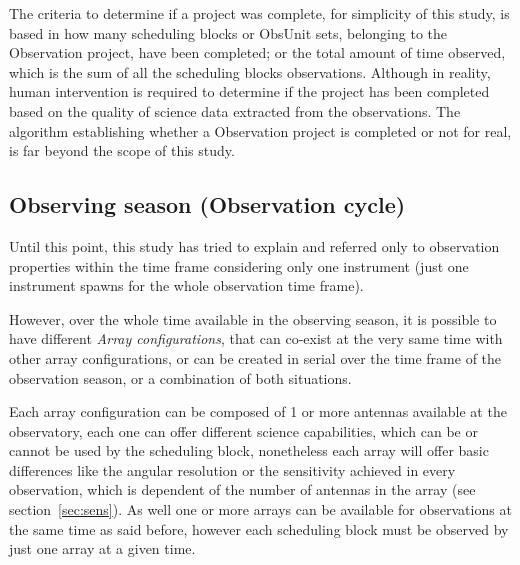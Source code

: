 The criteria to determine if a project was complete, for simplicity of this study, is based in how many scheduling blocks or ObsUnit sets, belonging to the Observation project, have been completed; or the total amount of time observed, which is the sum of all the scheduling blocks observations. Although in reality, human intervention is required to determine if the project has been completed based on the quality of science data extracted from the observations. The algorithm establishing whether a Observation project is completed or not for real, is far beyond the scope of this study. 

\subsection{Observing season (Observation cycle)}
Until this point, this study has tried to explain and referred only to observation properties within the time frame considering only one instrument (just one instrument spawns for the whole observation time frame). 

However, over the whole time available in the observing season, it is possible to have different \textit{Array configurations}, that can co-exist at the very same time with other array configurations, or can be created in serial over the time frame of the observation season, or a combination of both situations.

Each array configuration can be composed of 1 or more antennas available at the observatory, each one can offer different science capabilities, which can be or cannot be used by the scheduling block, nonetheless each array will offer basic differences like the angular resolution or the sensitivity achieved in every observation, which is dependent of the number of antennas in the array (see section~\ref{sec:sens}). As well one or more arrays can be available for observations at the same time as said before, however each scheduling block must be observed by just one array at a given time.

